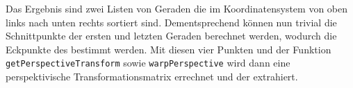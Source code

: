 Das Ergebnis sind zwei Listen von Geraden die im \QRCode Koordinatensystem von oben links nach unten rechts sortiert sind. Dementsprechend können nun trivial die Schnittpunkte der ersten und letzten Geraden berechnet werden, wodurch die Eckpunkte des \QRCodes bestimmt werden. Mit diesen vier Punkten und der \OpenCV Funktion  \texttt{getPerspectiveTransform} sowie \texttt{warpPerspective} wird dann eine perspektivische Transformationsmatrix errechnet und der \QRCode extrahiert.